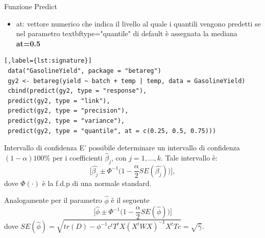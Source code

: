 \documentclass[usenames,dvipsnames]{beamer}
\begin{document}
\begin{frame}{Funzione Predict}
\begin{itemize}
\item at: vettore numerico che indica il livello al quale i quantili vengono predetti se nel parametro
textbf{type="quantile"} di default è assegnata la mediana \textbf{at=0.5}
\end{itemize}
 \begin{lstlisting}[,label={lst:signature}]
 data("GasolineYield", package = "betareg")
 gy2 <- betareg(yield ~ batch + temp | temp, data = GasolineYield)
 cbind(predict(gy2, type = "response"),
 predict(gy2, type = "link"),
 predict(gy2, type = "precision"),
 predict(gy2, type = "variance"),
 predict(gy2, type = "quantile", at = c(0.25, 0.5, 0.75)))
 \end{lstlisting}
\end{frame}



\begin{frame}[noframenumbering]{Intervallo di confidenza}
	E' possibile determinare un intervallo di confidenza $(1-\alpha)100\%$ per i coefficienti $\hat{\beta}_j$, con $j=1,...,k$. Tale intervallo è:
	$$ \bigg[\hat{\beta_j} \pm \Phi^{-1}\bigg(1-\frac{\alpha}{2}SE(\hat{\beta_j})\bigg)\bigg], $$
	dove $\Phi(\cdot)$ è la f.d.p di una normale standard. 
	
	Analogamente per il parametro $\hat{\phi}$ è il seguente
	$$\bigg[\hat{\phi} \pm \Phi^{-1}\bigg(1-\frac{\alpha}{2}SE(\hat{\phi})\bigg)  \bigg] $$ 
	dove $SE(\hat{\phi})=\sqrt{tr(D)-\phi^{-1}c^tT^tX(X^tWX)^{-1}X^tTc}=\sqrt{\hat{\gamma}}.$

\end{frame}
\end{document}

